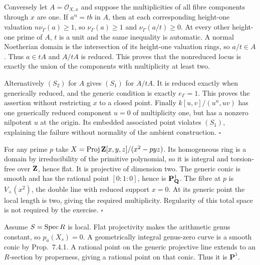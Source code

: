 \documentclass[11pt]{article}
\let\chapterexercise\exercise
\renewcommand{\exercise}[2]{\Needspace{8\baselineskip}\chapterexercise{#1}{#2}}
\begin{document}
Conversely let $A=\mathcal O_{X,x}$ and suppose the multiplicities of all fibre components through $x$ are one. If $a^n=tb$ in $A$, then at each corresponding height-one valuation $n\nu_\Gamma(a)\ge1$, so $\nu_\Gamma(a)\ge1$ and $\nu_\Gamma(a/t)\ge0$. At every other height-one prime of $A$, $t$ is a unit and the same inequality is automatic. A normal Noetherian domain is the intersection of its height-one valuation rings, so $a/t\in A$. Thus $a\in tA$ and $A/tA$ is reduced. This proves that the nonreduced locus is exactly the union of the components with multiplicity at least two.

Alternatively $(S_2)$ for $A$ gives $(S_1)$ for $A/tA$. It is reduced exactly when generically reduced, and the generic condition is exactly $e_\Gamma=1$. This proves the assertion without restricting $x$ to a closed point. Finally $k[u,v]/(u^n,uv)$ has one generically reduced component $u=0$ of multiplicity one, but has a nonzero nilpotent $u$ at the origin. Its embedded associated point violates $(S_1)$, explaining the failure without normality of the ambient construction. \hfill$\square$

\pf
For any prime $p$ take $X=\operatorname{Proj}\mathbf Z[x,y,z]/(x^2-pyz)$. Its homogeneous ring is a domain by irreducibility of the primitive polynomial, so it is integral and torsion-free over $\mathbf Z$, hence flat. It is projective of dimension two. The generic conic is smooth and has the rational point $[0:1:0]$, hence is $\mathbf P^1_\mathbf Q$. The fibre at $p$ is $V_+(x^2)$, the double line with reduced support $x=0$. At its generic point the local length is two, giving the required multiplicity. Regularity of this total space is not required by the exercise. \hfill$\square$

\pf
Assume $S=\operatorname{Spec} R$ is local. Flat projectivity makes the arithmetic genus constant, so $p_a(X_s)=0$. A geometrically integral genus-zero curve is a smooth conic by Prop.~7.4.1. A rational point on the generic projective line extends to an $R$-section by properness, giving a rational point on that conic. Thus it is $\mathbf P^1$.
\end{document}
